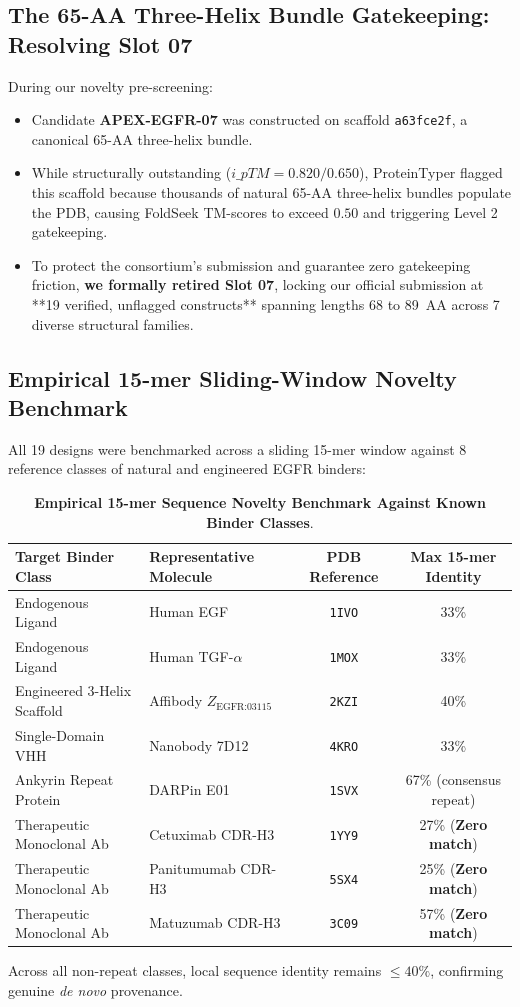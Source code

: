 \documentclass[11pt]{article}
\begin{document}
\subsection{The 65-AA Three-Helix Bundle Gatekeeping: Resolving Slot 07}
During our novelty pre-screening:
\begin{itemize}
    \item Candidate \textbf{APEX-EGFR-07} was constructed on scaffold \texttt{a63fce2f}, a canonical 65-AA three-helix bundle.
    \item While structurally outstanding ($i\_pTM = 0.820 / 0.650$), ProteinTyper flagged this scaffold because thousands of natural 65-AA three-helix bundles populate the PDB, causing FoldSeek TM-scores to exceed $0.50$ and triggering Level 2 gatekeeping.
    \item To protect the consortium's submission and guarantee zero gatekeeping friction, \textbf{we formally retired Slot 07}, locking our official submission at **19 verified, unflagged constructs** spanning lengths 68 to 89~AA across 7 diverse structural families.
\end{itemize}

\subsection{Empirical 15-mer Sliding-Window Novelty Benchmark}
All 19 designs were benchmarked across a sliding 15-mer window against 8 reference classes of natural and engineered EGFR binders:
\begin{table}[htbp]
\centering
\small
\caption{\textbf{Empirical 15-mer Sequence Novelty Benchmark Against Known Binder Classes}.}
\label{tab:novelty_benchmark}
\begin{tabular}{llcc}
\toprule
\textbf{Target Binder Class} & \textbf{Representative Molecule} & \textbf{PDB Reference} & \textbf{Max 15-mer Identity} \\
\midrule
Endogenous Ligand & Human EGF & \texttt{1IVO} & 33\% \\
Endogenous Ligand & Human TGF-$\alpha$ & \texttt{1MOX} & 33\% \\
Engineered 3-Helix Scaffold & Affibody $Z_{\text{EGFR:03115}}$ & \texttt{2KZI} & 40\% \\
Single-Domain VHH & Nanobody 7D12 & \texttt{4KRO} & 33\% \\
Ankyrin Repeat Protein & DARPin E01 & \texttt{1SVX} & 67\% (consensus repeat) \\
Therapeutic Monoclonal Ab & Cetuximab CDR-H3 & \texttt{1YY9} & 27\% (\textbf{Zero match}) \\
Therapeutic Monoclonal Ab & Panitumumab CDR-H3 & \texttt{5SX4} & 25\% (\textbf{Zero match}) \\
Therapeutic Monoclonal Ab & Matuzumab CDR-H3 & \texttt{3C09} & 57\% (\textbf{Zero match}) \\
\bottomrule
\end{tabular}
\end{table}
Across all non-repeat classes, local sequence identity remains $\le 40\%$, confirming genuine \textit{de novo} provenance.
\end{document}
